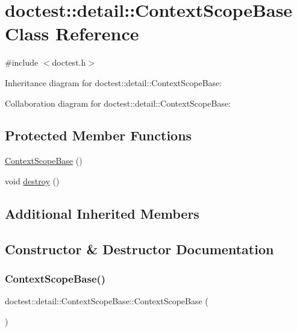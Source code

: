 \hypertarget{classdoctest_1_1detail_1_1_context_scope_base}{}\section{doctest\+:\+:detail\+:\+:Context\+Scope\+Base Class Reference}
\label{classdoctest_1_1detail_1_1_context_scope_base}


{\ttfamily \#include $<$doctest.\+h$>$}



Inheritance diagram for doctest\+:\+:detail\+:\+:Context\+Scope\+Base\+:


Collaboration diagram for doctest\+:\+:detail\+:\+:Context\+Scope\+Base\+:
\subsection*{Protected Member Functions}
\begin{DoxyCompactItemize}
\item 
\hyperlink{classdoctest_1_1detail_1_1_context_scope_base_af3a3ff7ad6b98142ef0f7e1d01912d48}{Context\+Scope\+Base} ()
\item 
void \hyperlink{classdoctest_1_1detail_1_1_context_scope_base_a6f223de9a972b08bf1b9e9d2d99ab4c6}{destroy} ()
\end{DoxyCompactItemize}
\subsection*{Additional Inherited Members}


\subsection{Constructor \& Destructor Documentation}
\mbox{\label{classdoctest_1_1detail_1_1_context_scope_base_af3a3ff7ad6b98142ef0f7e1d01912d48}} 
\subsubsection{\texorpdfstring{Context\+Scope\+Base()}{ContextScopeBase()}}
{\footnotesize\ttfamily doctest\+::detail\+::\+Context\+Scope\+Base\+::\+Context\+Scope\+Base (\begin{DoxyParamCaption}{ }\end{DoxyParamCaption})\hspace{0.3cm}{\ttfamily [protected]}}



